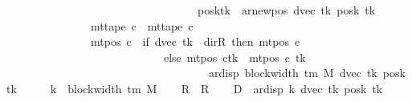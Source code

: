 \begin{isabellebody}
\ \ \ \ \ \ \ \ \ \ \ \ \ \ \ \ \ \ \ \ \ \ \ \ \ \ \ \ \ \ \ \ \ \ posk{\isacharparenleft}{\kern0pt}tk\ {\isacharcolon}{\kern0pt}{\isacharequal}{\kern0pt}\ ar{\isacharunderscore}{\kern0pt}newpos\ {\isacharparenleft}{\kern0pt}dvec\ tk{\isacharparenright}{\kern0pt}\ {\isacharparenleft}{\kern0pt}posk\ tk{\isacharparenright}{\kern0pt}{\isacharparenright}{\kern0pt}{\isacharparenright}{\kern0pt}\isanewline
\ \ \ \ \ \ \ \ \ \ \ \ \ \ {\isasymand}\ mt{\isacharunderscore}{\kern0pt}tape\ c{\isacharprime}{\kern0pt}\ {\isacharequal}{\kern0pt}\ mt{\isacharunderscore}{\kern0pt}tape\ c{}\isanewline
\ \ \ \ \ \ \ \ \ \ \ \ \ \ {\isasymand}\ mt{\isacharunderscore}{\kern0pt}pos\ c{\isacharprime}{\kern0pt}\ {\isacharequal}{\kern0pt}\ {\isacharparenleft}{\kern0pt}if\ dvec\ tk\ {\isacharequal}{\kern0pt}\ dir{\isachardot}{\kern0pt}R\ then\ mt{\isacharunderscore}{\kern0pt}pos\ c{}\isanewline
\ \ \ \ \ \ \ \ \ \ \ \ \ \ \ \ \ \ \ \ \ \ \ \ \ \ \ \ else\ {\isacharparenleft}{\kern0pt}mt{\isacharunderscore}{\kern0pt}pos\ c{}{\isacharparenright}{\kern0pt}{\isacharparenleft}{\kern0pt}tk\ {\isacharcolon}{\kern0pt}{\isacharequal}{\kern0pt}\ mt{\isacharunderscore}{\kern0pt}pos\ c{}\ tk\isanewline
\ \ \ \ \ \ \ \ \ \ \ \ \ \ \ \ \ \ \ \ \ \ \ \ \ \ \ \ \ \ \ \ \ \ \ {\isacharminus}{\kern0pt}\ ar{\isacharunderscore}{\kern0pt}disp\ {\isacharparenleft}{\kern0pt}block{\isacharunderscore}{\kern0pt}width\ {\isacharparenleft}{\kern0pt}{\isasymGamma}{\isacharunderscore}{\kern0pt}tm\ M{\isacharparenright}{\kern0pt}{\isacharparenright}{\kern0pt}\ {\isacharparenleft}{\kern0pt}dvec\ tk{\isacharparenright}{\kern0pt}\ {\isacharparenleft}{\kern0pt}posk\ tk{\isacharparenright}{\kern0pt}{\isacharparenright}{\kern0pt}{\isacharparenright}{\kern0pt}{\isachardoublequoteclose}\isanewline
%
\isadelimproof
%
\endisadelimproof
%
\isatagproof
{}\isamarkupfalse%
\ {\isacharminus}{\kern0pt}\isanewline
\ \ \isamarkupfalse%
\ {\isacharquery}{\kern0pt}k\ {\isacharequal}{\kern0pt}\ {\isachardoublequoteopen}block{\isacharunderscore}{\kern0pt}width\ {\isacharparenleft}{\kern0pt}{\isasymGamma}{\isacharunderscore}{\kern0pt}tm\ M{\isacharparenright}{\kern0pt}{\isachardoublequoteclose}\isanewline
\ \ \isamarkupfalse%
\ {\isacharquery}{\kern0pt}R\ {\isacharequal}{\kern0pt}\ R{\isacharprime}{\kern0pt}\isanewline
\ \ \isamarkupfalse%
\ {\isacharquery}{\kern0pt}D\ {\isacharequal}{\kern0pt}\ {\isachardoublequoteopen}ar{\isacharunderscore}{\kern0pt}disp\ {\isacharquery}{\kern0pt}k\ {\isacharparenleft}{\kern0pt}dvec\ tk{\isacharparenright}{\kern0pt}\ {\isacharparenleft}{\kern0pt}posk\ tk{\isacharparenright}{\kern0pt}{\isachardoublequoteclose}\isanewline

\end{isabellebody}
